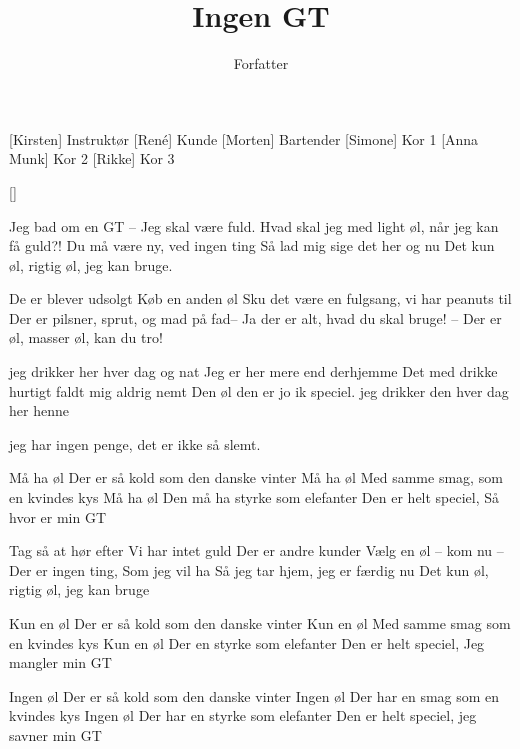 \documentclass[a4paper,11pt]{article}
\title{Ingen GT}
\author{Forfatter}
\begin{document}
\maketitle

\begin{roles}
[Kirsten] Instruktør
[René] Kunde
[Morten] Bartender
[Simone] Kor 1
[Anna Munk] Kor 2
[Rikke] Kor 3
\end{roles}

\begin{props}
[]
\end{props}

\begin{song}
 Jeg bad om en GT -- Jeg skal være fuld.
 Hvad skal jeg med light øl, når jeg kan få guld?!
 Du må være ny, ved ingen ting
 Så lad mig sige det her og nu
 Det kun øl, rigtig øl, jeg kan bruge.

 De er blever udsolgt
 Køb en anden øl
 Sku det være en fulgsang, vi har peanuts til
 Der er pilsner, sprut, og mad på fad--
 Ja der er alt, hvad du skal bruge! --
 Der er øl, masser øl, kan du tro!

 jeg drikker her hver dag og nat
 Jeg er her mere end derhjemme
 Det med drikke hurtigt faldt mig aldrig nemt
 Den øl den er jo ik speciel.
 jeg drikker den hver dag her henne

 jeg har ingen penge, det er ikke så slemt.

 Må ha øl
 Der er så kold som den danske vinter
 Må ha øl
 Med samme smag, som en kvindes kys
 Må ha øl
 Den må ha styrke som elefanter
 Den er helt speciel, Så hvor er min GT

 Tag så at hør efter
 Vi har intet guld
 Der er andre kunder
 Vælg en øl -- kom nu --
 Der er ingen ting, Som jeg vil ha
 Så jeg tar hjem, jeg er færdig nu
 Det kun øl, rigtig øl, jeg kan bruge

 Kun en øl
 Der er så kold som den danske vinter
 Kun en øl
 Med samme smag som en kvindes kys
 Kun en øl
 Der en styrke som elefanter
 Den er helt speciel, Jeg mangler min GT

 Ingen øl
 Der er så kold som den danske vinter
 Ingen øl
 Der har en smag som en kvindes kys
 Ingen øl
 Der har en styrke som elefanter
 Den er helt speciel, jeg savner min GT
\end{song}
\end{document}
